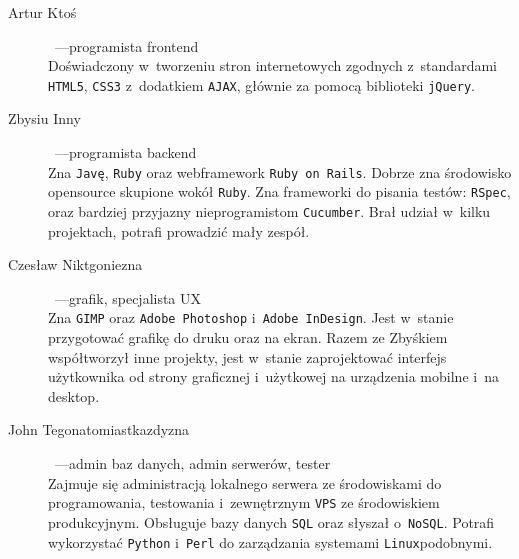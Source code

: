 \documentclass[10pt,a4paper]{article}
\begin{document}
\begin{description}
  \item[Artur Ktoś]~---\quad programista front\dywiz end \hfill \\
    Doświadczony w~tworzeniu stron internetowych zgodnych z~standardami
    \texttt{HTML5}, \texttt{CSS3} z~dodatkiem \texttt{AJAX}, głównie za pomocą
    biblioteki \texttt{jQuery}.
  \item[Zbysiu Inny]~---\quad programista back\dywiz end \hfill \\
    Zna \texttt{Javę}, \texttt{Ruby} oraz web\dywiz framework \texttt{Ruby on
    Rails}.  Dobrze zna środowisko open\dywiz source skupione wokół
    \texttt{Ruby}. Zna frameworki do pisania testów: \texttt{RSpec}, oraz
    bardziej przyjazny nie\dywiz programistom \texttt{Cucumber}. Brał udział
    w~kilku projektach, potrafi prowadzić mały zespół.
  \item[Czesław Niktgoniezna]~---\quad grafik, specjalista UX \hfill \\
    Zna \texttt{GIMP} oraz {\tt Adobe Photoshop} i~\texttt{Adobe InDesign}.
    Jest w~stanie przygotować grafikę do druku oraz na ekran. Razem ze Zbyśkiem
    współtworzył inne projekty, jest w~stanie zaprojektować interfejs
    użytkownika od strony graficznej i~użytkowej na urządzenia mobilne i~na
    desktop.
  \item[John Tegonatomiastkazdyzna]~---\quad admin baz danych, admin serwerów, tester \hfill \\
    Zajmuje się administracją lokalnego serwera ze środowiskami do
    programowania, testowania i~zewnętrznym \texttt{VPS} ze środowiskiem
    produkcyjnym. Obsługuje bazy danych \texttt{SQL} oraz słyszał
    o~\texttt{NoSQL}. Potrafi wykorzystać \texttt{Python} i~\texttt{Perl} do
    zarządzania systemami \texttt{Linux}\dywiz podobnymi.
\end{description}
\end{document}
